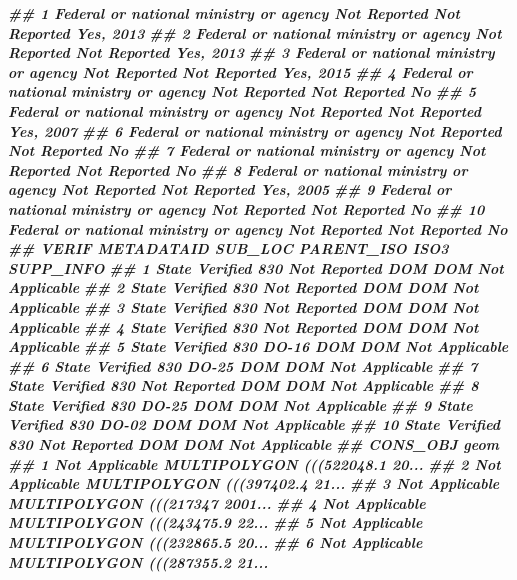 \documentclass[10pt,landscape,a3paper]{article}
\newenvironment{Shaded}{\begin{snugshade}}{\end{snugshade}}
\newcommand{\DocumentationTok}[1]{\textcolor[rgb]{0.56,0.35,0.01}{\textbf{\textit{#1}}}}
\begin{document}
\begin{Shaded}
\begin{Highlighting}[]
\DocumentationTok{\#\# 1  Federal or national ministry or agency Not Reported Not Reported Yes, 2013}
\DocumentationTok{\#\# 2  Federal or national ministry or agency Not Reported Not Reported Yes, 2013}
\DocumentationTok{\#\# 3  Federal or national ministry or agency Not Reported Not Reported Yes, 2015}
\DocumentationTok{\#\# 4  Federal or national ministry or agency Not Reported Not Reported        No}
\DocumentationTok{\#\# 5  Federal or national ministry or agency Not Reported Not Reported Yes, 2007}
\DocumentationTok{\#\# 6  Federal or national ministry or agency Not Reported Not Reported        No}
\DocumentationTok{\#\# 7  Federal or national ministry or agency Not Reported Not Reported        No}
\DocumentationTok{\#\# 8  Federal or national ministry or agency Not Reported Not Reported Yes, 2005}
\DocumentationTok{\#\# 9  Federal or national ministry or agency Not Reported Not Reported        No}
\DocumentationTok{\#\# 10 Federal or national ministry or agency Not Reported Not Reported        No}
\DocumentationTok{\#\#             VERIF METADATAID      SUB\_LOC PARENT\_ISO ISO3      SUPP\_INFO}
\DocumentationTok{\#\# 1  State Verified        830 Not Reported        DOM  DOM Not Applicable}
\DocumentationTok{\#\# 2  State Verified        830 Not Reported        DOM  DOM Not Applicable}
\DocumentationTok{\#\# 3  State Verified        830 Not Reported        DOM  DOM Not Applicable}
\DocumentationTok{\#\# 4  State Verified        830 Not Reported        DOM  DOM Not Applicable}
\DocumentationTok{\#\# 5  State Verified        830        DO{-}16        DOM  DOM Not Applicable}
\DocumentationTok{\#\# 6  State Verified        830        DO{-}25        DOM  DOM Not Applicable}
\DocumentationTok{\#\# 7  State Verified        830 Not Reported        DOM  DOM Not Applicable}
\DocumentationTok{\#\# 8  State Verified        830        DO{-}25        DOM  DOM Not Applicable}
\DocumentationTok{\#\# 9  State Verified        830        DO{-}02        DOM  DOM Not Applicable}
\DocumentationTok{\#\# 10 State Verified        830 Not Reported        DOM  DOM Not Applicable}
\DocumentationTok{\#\#          CONS\_OBJ                           geom}
\DocumentationTok{\#\# 1  Not Applicable MULTIPOLYGON (((522048.1 20...}
\DocumentationTok{\#\# 2  Not Applicable MULTIPOLYGON (((397402.4 21...}
\DocumentationTok{\#\# 3  Not Applicable MULTIPOLYGON (((217347 2001...}
\DocumentationTok{\#\# 4  Not Applicable MULTIPOLYGON (((243475.9 22...}
\DocumentationTok{\#\# 5  Not Applicable MULTIPOLYGON (((232865.5 20...}
\DocumentationTok{\#\# 6  Not Applicable MULTIPOLYGON (((287355.2 21...}

\end{Highlighting}
\end{Shaded}
\end{document}
